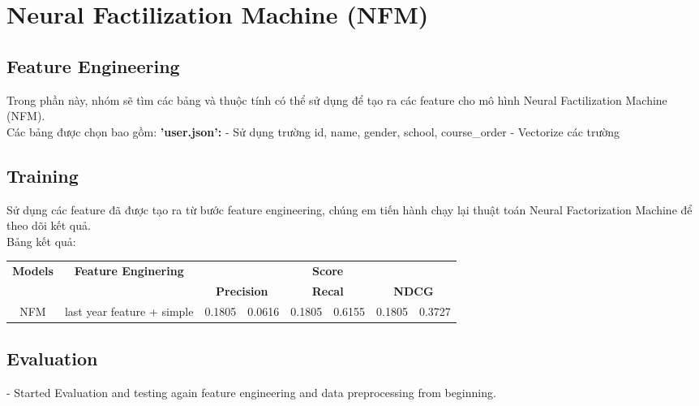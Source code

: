 \section{Neural Factilization Machine (NFM)}
\subsection{Feature Engineering}
Trong phần này, nhóm sẽ tìm các bảng và thuộc tính có thể sử dụng để tạo ra các feature cho mô hình Neural Factilization Machine (NFM).\\
Các bảng được chọn bao gồm:
\textbf{'user.json':}
- Sử dụng trường id, name, gender, school, course\_order 
- Vectorize các trường
\subsection{Training}
Sử dụng các feature đã được tạo ra từ bước feature engineering, chúng em tiến hành chạy lại thuật toán Neural Factorization Machine để theo dõi kết quả.\\
Bảng kết quả:
\begin{table}[]
    \begin{tabular}{ccclllll}
    \hline
    \multirow{2}{*}{\textbf{Models}} &
      \multirow{2}{*}{\textbf{Feature Enginering}} &
      \multicolumn{6}{c}{\textbf{Score}} \\ \cline{3-8} 
     &
       &
      \multicolumn{2}{c}{\textbf{Precision}} &
      \multicolumn{2}{c}{\textbf{Recal}} &
      \multicolumn{2}{c}{\textbf{NDCG}} \\ \hline
    NFM &
      \multicolumn{1}{l}{last year feature + simple} &
      \multicolumn{1}{l}{0.1805} &
      0.0616 &
      0.1805 &
      0.6155 &
      0.1805 &
      0.3727
\end{tabular}
\end{table}
\subsection{Evaluation}
- Started Evaluation and testing again feature engineering and data preprocessing from beginning.\\